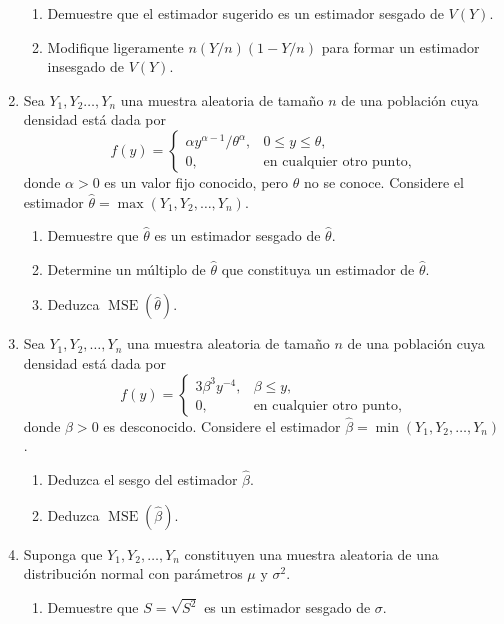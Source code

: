 \documentclass[a4paper]{scrreprt}
\begin{document}
\begin{enumerate}
\begin{enumerate}
	\item Demuestre que el estimador sugerido es un estimador sesgado de $V\left(Y\right)$.
	\item Modifique ligeramente $n\left(Y/n\right)\left(1-Y/n\right)$ para formar un estimador insesgado de $V\left(Y\right)$.
\end{enumerate}
\item Sea $Y_{1},Y_{2}\ldots,Y_{n}$ una muestra aleatoria de tamaño $n$ de una población cuya densidad está dada por \[ f\left(y\right)=\begin{cases}\alpha y^{\alpha-1}/\theta^{\alpha},& 0\leq y\leq\theta,\\0,&\text{en cualquier otro punto},\end{cases} \] donde $\alpha>0$ es un valor fijo conocido, pero $\theta$ no se conoce. Considere el estimador $\hat{\theta}=\max\left(Y_{1},Y_{2},\ldots,Y_{n}\right)$.
\begin{enumerate}
	\item Demuestre que $\hat{\theta}$ es un estimador sesgado de $\hat{\theta}$.
	\item Determine un múltiplo de $\hat{\theta}$ que constituya un estimador de $\hat{\theta}$.
	\item Deduzca $\operatorname{MSE}\left(\hat{\theta}\right)$.
\end{enumerate}
\item Sea $Y_{1},Y_{2},\ldots,Y_{n}$ una muestra aleatoria de tamaño $n$ de una población cuya densidad está dada por \[ f\left(y\right)=\begin{cases}3\beta^{3}y^{-4},& \beta\leq y,\\
0,&\text{en cualquier otro punto},\end{cases} \] donde $\beta>0$ es desconocido. Considere el estimador $\hat{\beta}=\min\left(Y_{1},Y_{2},\ldots,Y_{n}\right)$.
\begin{enumerate}
	\item Deduzca el sesgo del estimador $\hat{\beta}$.
	\item Deduzca $\operatorname{MSE}\left(\hat{\beta}\right)$.
\end{enumerate}
\item Suponga que $Y_{1},Y_{2},\ldots,Y_{n}$ constituyen una muestra aleatoria de una distribución normal con parámetros $\mu$ y $\sigma^{2}$.
\begin{enumerate}
	\item Demuestre que $S=\sqrt{S^{2}}$ es un estimador sesgado de $\sigma$.

\end{enumerate}
\end{enumerate}
\end{document}
